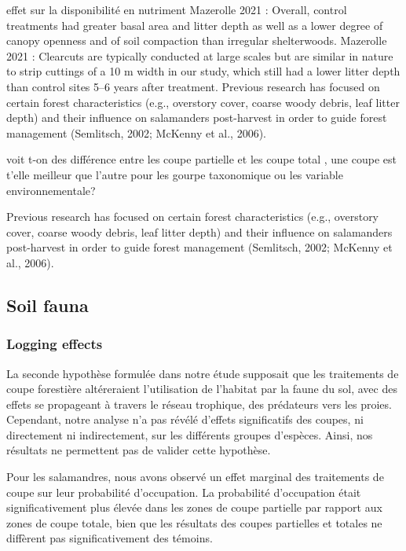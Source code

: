 effet sur la disponibilité en nutriment
Mazerolle 2021 : Overall, control treatments had greater basal area and litter depth as well as a lower degree of canopy openness and of soil compaction than irregular shelterwoods.
Mazerolle 2021 : Clearcuts are typically conducted at large scales but are similar in nature to strip cuttings of a 10 m width in our study, which still had a lower litter depth than control sites 5–6 years after treatment.
Previous research has focused on certain forest characteristics (e.g., overstory cover, coarse woody debris, leaf litter depth) and their influence on salamanders post-harvest in order to guide forest management (Semlitsch, 2002; McKenny et al., 2006).

voit t-on des différence entre les coupe partielle et les coupe total , une coupe est t'elle meilleur que l'autre pour les gourpe taxonomique ou les variable environnementale?

Previous research has focused on certain forest characteristics (e.g., overstory cover, coarse woody debris, leaf litter depth) and their influence on salamanders post-harvest in order to guide forest management (Semlitsch, 2002; McKenny et al., 2006).



\subsection*{Soil fauna}
\label{disc:soil_fauna}


\subsubsection*{Logging effects}
\label{disc:logging_effects}


La seconde hypothèse formulée dans notre étude supposait que les traitements de coupe forestière altéreraient l'utilisation de l'habitat par la faune du sol, avec des effets se propageant à 
travers le réseau trophique, des prédateurs vers les proies. 
Cependant, notre analyse n'a pas révélé d'effets significatifs des coupes, ni directement ni indirectement, sur les différents groupes d'espèces. 
Ainsi, nos résultats ne permettent pas de valider cette hypothèse.

Pour les salamandres, nous avons observé un effet marginal des traitements de coupe sur leur probabilité d'occupation. 
La probabilité d'occupation était significativement plus élevée dans les zones de coupe partielle par rapport aux zones de coupe totale, 
bien que les résultats des coupes partielles et totales ne diffèrent pas significativement des témoins.

